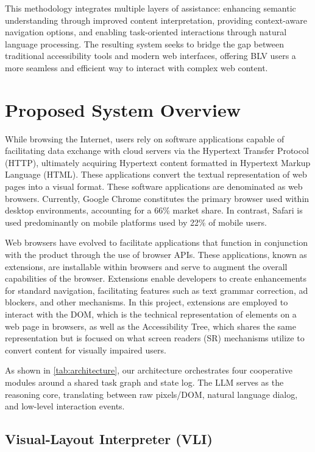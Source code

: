 \documentclass[conference]{IEEEtran}
\begin{document}
This methodology integrates multiple layers of assistance: enhancing semantic understanding through improved content interpretation, providing context-aware navigation options, and enabling task-oriented interactions through natural language processing. The resulting system seeks to bridge the gap between traditional accessibility tools and modern web interfaces, offering BLV users a more seamless and efficient way to interact with complex web content.

\section{Proposed System Overview}\label{system}

While browsing the Internet, users rely on software applications capable of facilitating data exchange with cloud servers via the Hypertext Transfer Protocol (HTTP), ultimately acquiring Hypertext content formatted in Hypertext Markup Language (HTML). These applications convert the textual representation of web pages into a visual format. These software applications are denominated as web browsers. Currently, Google Chrome constitutes the primary browser used within desktop environments, accounting for a 66\% market share. In contrast, Safari is used predominantly on mobile platforms used by 22\% of mobile users.\cite{browserstats2025}

Web browsers have evolved to facilitate applications that function in conjunction with the product through the use of browser APIs. These applications, known as extensions, are installable within browsers and serve to augment the overall capabilities of the browser. Extensions enable developers to create enhancements for standard navigation, facilitating features such as text grammar correction, ad blockers, and other mechanisms. In this project, extensions are employed to interact with the DOM, which is the technical representation of elements on a web page in browsers, as well as the Accessibility Tree, which shares the same representation but is focused on what screen readers (SR) mechanisms utilize to convert content for visually impaired users.

As shown in \autoref{tab:architecture}, our architecture orchestrates four cooperative modules around a shared task graph and state log. The LLM serves as the reasoning core, translating between raw pixels/DOM, natural language dialog, and low-level interaction events.

\subsection{Visual‑Layout Interpreter (VLI)}
\end{document}
